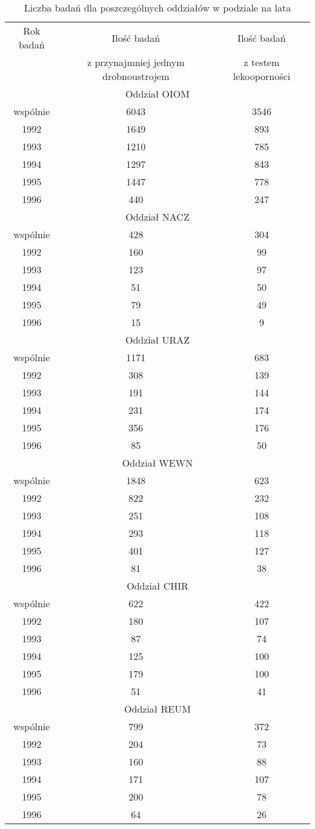 \documentclass[a4paper,11pt]{article}
\begin{document}
\begin{table}[H]
\begin{center}
\caption{Liczba badań dla poszczególnych oddziałów w podziale na lata}
\begin{tabular}{c|c|c}
\hline
Rok badań & Ilość badań & Ilość badań \\
& z przynajmniej jednym drobnoustrojem &z testem lekooporności \\
\hline \multicolumn{3}{|c|}{Oddział OIOM} \\ \hline
wspólnie &6043 &3546 \\
1992 &1649 &893 \\
1993 &1210 &785 \\
1994 &1297 &843 \\
1995 &1447 &778 \\
1996 &440 &247 \\
\hline \multicolumn{3}{|c|}{Oddział NACZ} \\ \hline
wspólnie &428 &304 \\
1992 &160 &99 \\
1993 &123 &97 \\
1994 &51 &50 \\
1995 &79 &49 \\
1996 &15 &9 \\
\hline \multicolumn{3}{|c|}{Oddział URAZ} \\ \hline
wspólnie &1171 &683 \\
1992 &308 &139 \\
1993 &191 &144 \\
1994 &231 &174 \\
1995 &356 &176 \\
1996 &85 &50 \\
\hline \multicolumn{3}{|c|}{Oddział WEWN} \\ \hline
wspólnie &1848 &623 \\
1992 &822 &232 \\
1993 &251 &108 \\
1994 &293 &118 \\
1995 &401 &127 \\
1996 &81 &38 \\
\hline \multicolumn{3}{|c|}{Oddział CHIR} \\ \hline
wspólnie &622 &422 \\
1992 &180 &107 \\
1993 &87 &74 \\
1994 &125 &100 \\
1995 &179 &100 \\
1996 &51 &41 \\
\hline \multicolumn{3}{|c|}{Oddział REUM} \\ \hline
wspólnie &799 &372 \\
1992 &204 &73 \\
1993 &160 &88 \\
1994 &171 &107 \\
1995 &200 &78 \\
1996 &64 &26 \\

\hline
\end{tabular}
\end{center}
\end{table}
\end{document}

